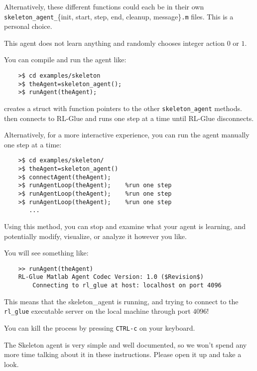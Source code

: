 \documentclass[11pt]{article}
\begin{document}
Alternatively, these different functions could each be in their own \texttt{skeleton\_agent\_}\{init, start, step, end, cleanup, message\}\texttt{.m} files.  This is a personal choice.

This agent does not learn anything and randomly chooses integer action $0$ or $1$.  

You can compile and run the agent like:
\begin{verbatim}
	>$ cd examples/skeleton
	>$ theAgent=skeleton_agent();
	>$ runAgent(theAgent);
\end{verbatim}

 creates a struct with function pointers to the other \texttt{skeleton\_agent} methods.   then
connects to RL-Glue and runs one step at a time until RL-Glue disconnects.

Alternatively, for a more interactive experience, you can run the agent manually one step at a time:
\begin{verbatim}
	>$ cd examples/skeleton/
	>$ theAgent=skeleton_agent()
	>$ connectAgent(theAgent);
	>$ runAgentLoop(theAgent);    %run one step
	>$ runAgentLoop(theAgent);    %run one step
	>$ runAgentLoop(theAgent);    %run one step
	   ...
\end{verbatim}

Using this method, you can stop and examine what your agent is learning, and potentially modify, visualize, or analyze it however you like.

You will see something like:
\begin{verbatim}
	>> runAgent(theAgent)
	RL-Glue Matlab Agent Codec Version: 1.0 ($Revision$)
	    Connecting to rl_glue at host: localhost on port 4096
\end{verbatim}

This means that the skeleton\_agent is running, and trying to connect to the \texttt{rl\_glue} executable server on the local machine through port $4096$! 

You can kill the process by pressing \texttt{CTRL-c} on your keyboard.


The Skeleton agent is very simple and well documented, so we won't spend any more time talking about it in these instructions.
Please open it up and take a look.
\end{document}

